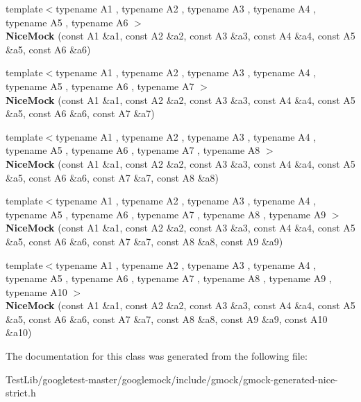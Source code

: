 \begin{DoxyCompactItemize}
\item 
\mbox{\label{classtesting_1_1NiceMock_a156d0fce85ac08abffdf4aa0c3975f81}} 
{\footnotesize template$<$typename A1 , typename A2 , typename A3 , typename A4 , typename A5 , typename A6 $>$ }\\{\bfseries Nice\+Mock} (const A1 \&a1, const A2 \&a2, const A3 \&a3, const A4 \&a4, const A5 \&a5, const A6 \&a6)
\item 
\mbox{\label{classtesting_1_1NiceMock_a946d75ece1fa3a066b7d9d6ab7828c55}} 
{\footnotesize template$<$typename A1 , typename A2 , typename A3 , typename A4 , typename A5 , typename A6 , typename A7 $>$ }\\{\bfseries Nice\+Mock} (const A1 \&a1, const A2 \&a2, const A3 \&a3, const A4 \&a4, const A5 \&a5, const A6 \&a6, const A7 \&a7)
\item 
\mbox{\label{classtesting_1_1NiceMock_ae8792aab6c024a50886856bf1093eedc}} 
{\footnotesize template$<$typename A1 , typename A2 , typename A3 , typename A4 , typename A5 , typename A6 , typename A7 , typename A8 $>$ }\\{\bfseries Nice\+Mock} (const A1 \&a1, const A2 \&a2, const A3 \&a3, const A4 \&a4, const A5 \&a5, const A6 \&a6, const A7 \&a7, const A8 \&a8)
\item 
\mbox{\label{classtesting_1_1NiceMock_a61cfc9282222928590bcdaf851a806c6}} 
{\footnotesize template$<$typename A1 , typename A2 , typename A3 , typename A4 , typename A5 , typename A6 , typename A7 , typename A8 , typename A9 $>$ }\\{\bfseries Nice\+Mock} (const A1 \&a1, const A2 \&a2, const A3 \&a3, const A4 \&a4, const A5 \&a5, const A6 \&a6, const A7 \&a7, const A8 \&a8, const A9 \&a9)
\item 
\mbox{\label{classtesting_1_1NiceMock_a4baf1da52f4c892fc02f6ba10c0b8c02}} 
{\footnotesize template$<$typename A1 , typename A2 , typename A3 , typename A4 , typename A5 , typename A6 , typename A7 , typename A8 , typename A9 , typename A10 $>$ }\\{\bfseries Nice\+Mock} (const A1 \&a1, const A2 \&a2, const A3 \&a3, const A4 \&a4, const A5 \&a5, const A6 \&a6, const A7 \&a7, const A8 \&a8, const A9 \&a9, const A10 \&a10)
\end{DoxyCompactItemize}


The documentation for this class was generated from the following file\+:\begin{DoxyCompactItemize}
\item 
Test\+Lib/googletest-\/master/googlemock/include/gmock/gmock-\/generated-\/nice-\/strict.\+h\end{DoxyCompactItemize}
